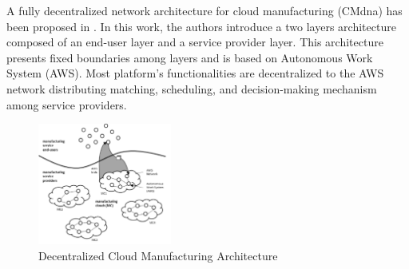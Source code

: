 A fully decentralized network architecture for cloud manufacturing (CMdna) has been proposed in \textcite{skulj_decentralised_2015}. In this work, the authors introduce a two layers architecture composed of an end-user layer and a service provider layer. This architecture presents fixed boundaries among layers and is based on Autonomous Work System (AWS). Most platform’s functionalities are decentralized to the AWS network distributing matching, scheduling, and decision-making mechanism among service providers.
\begin{figure}
    \centering
    \includegraphics[height=4cm, keepaspectratio]{images/decentralized-cmfg-architecture}
    \caption{Decentralized Cloud Manufacturing Architecture}
    \label{fig:decentralized-cmfg-architecture}
\end{figure}

